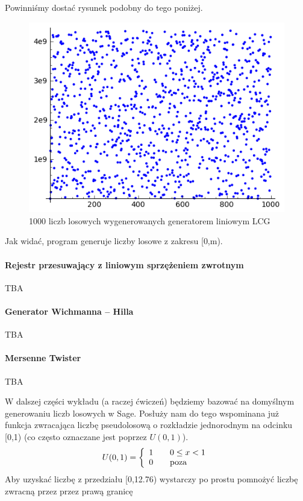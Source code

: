 \documentclass[a4paper,12pt,polish]{sphinxmanual}
\begin{document}
Powinniśmy dostać rysunek podobny do tego poniżej.
\begin{figure}[htbp]
\centering
\capstart

\includegraphics{sage0.png}
\caption{1000 liczb losowych wygenerowanych generatorem liniowym LCG}\end{figure}

Jak widać, program generuje liczby losowe z zakresu {[}0,m).


\paragraph{Rejestr przesuwający z liniowym sprzężeniem zwrotnym}
\label{ch5/chV011:rejestr-przesuwajacy-z-liniowym-sprzezeniem-zwrotnym}
TBA


\paragraph{Generator Wichmanna -- Hilla}
\label{ch5/chV011:generator-wichmanna-hilla}
TBA


\paragraph{Mersenne Twister}
\label{ch5/chV011:id3}
TBA

W dalszej części wykładu (a raczej ćwiczeń) będziemy bazować na domyślnym generowaniu liczb losowych w Sage.
Posłuży nam do tego wspominana już funkcja  zwracająca liczbę pseudolosową o rozkładzie jednorodnym
na odcinku {[}0,1) (co często oznaczane jest poprzez $U(0,1)$).
\begin{gather}
\begin{split}U(0,1) = \left\{ \begin{array}{l l} 1 & \quad 0 \le x < 1\\ 0 & \quad \text{poza}\\ \end{array} \right.\end{split}\notag
\end{gather}
Aby uzyskać liczbę z przedziału {[}0,12.76)
wystarczy po prostu pomnożyć liczbę zwracną przez  przez prawą granicę
\end{document}
